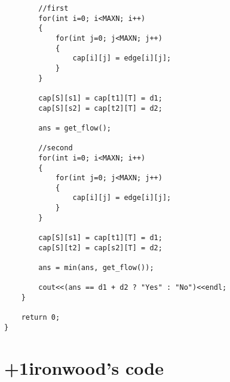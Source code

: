 \documentclass[10pt,twocolumn,oneside]{article}
\begin{document}
\begin{lstlisting}
        //first
        for(int i=0; i<MAXN; i++)
        {
            for(int j=0; j<MAXN; j++)
            {
                cap[i][j] = edge[i][j];
            }
        }

        cap[S][s1] = cap[t1][T] = d1;
        cap[S][s2] = cap[t2][T] = d2;

        ans = get_flow();

        //second
        for(int i=0; i<MAXN; i++)
        {
            for(int j=0; j<MAXN; j++)
            {
                cap[i][j] = edge[i][j];
            }
        }

        cap[S][s1] = cap[t1][T] = d1;
        cap[S][t2] = cap[s2][T] = d2;

        ans = min(ans, get_flow());

        cout<<(ans == d1 + d2 ? "Yes" : "No")<<endl;
    }

    return 0;
}
\end{lstlisting}

\section{+1ironwood's code}
\end{document}
